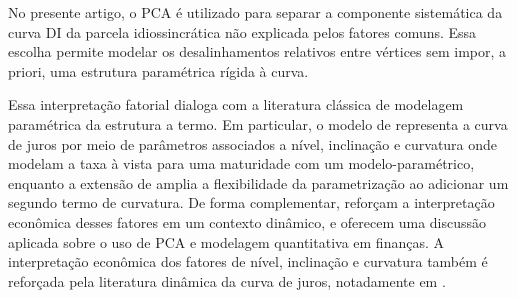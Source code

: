 \documentclass[fleqn]{rbfin}
\begin{document}



 



No presente artigo, o PCA é utilizado para separar a componente sistemática da curva DI da parcela idiossincrática não explicada pelos fatores comuns. Essa escolha permite modelar os desalinhamentos relativos entre vértices sem impor, a priori, uma estrutura paramétrica rígida à curva.

Essa interpretação fatorial dialoga com a literatura clássica de modelagem paramétrica da estrutura a termo. Em particular, o modelo de \cite{nelson1987parsimonious} representa a curva de juros por meio de parâmetros associados a nível, inclinação e curvatura onde modelam a taxa à vista para uma maturidade com um modelo-paramétrico, enquanto a extensão de \cite{svensson1994estimating} amplia a flexibilidade da parametrização ao adicionar um segundo termo de curvatura. De forma complementar, \cite{diebold2006forecasting} reforçam a interpretação econômica desses fatores em um contexto dinâmico, e \cite{wilmott2013paul} oferecem uma discussão aplicada sobre o uso de PCA e modelagem quantitativa em finanças. A interpretação econômica dos fatores de nível, inclinação e curvatura também é reforçada pela literatura dinâmica da curva de juros, notadamente em \cite{diebold2006forecasting}.
\end{document}
